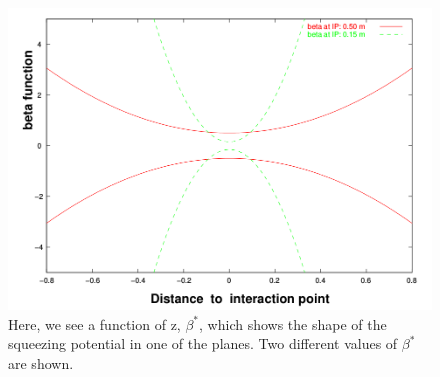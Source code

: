 \begin{figure}
\begin{center}
\includegraphics[width=\linewidth,height=\textheight,keepaspectratio]{../HourglassCorrection/figs/beta_function}
\caption{
Here, we see a function of z, $\beta^{*}$, which shows the shape of the
squeezing potential in one of the planes. Two different values of $\beta^{*}$
are shown.
}
\label{fig:beta_function}
\end{center}
\end{figure}
